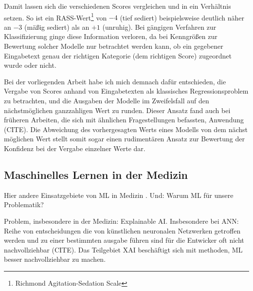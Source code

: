 Damit lassen sich die verschiedenen Scores vergleichen und in ein Verhältnis setzen. So ist ein RASS-Wert\footnote{Richmond Agitation-Sedation Scale} von $-4$ (tief sediert) beispielsweise deutlich näher an $-3$ (mäßig sediert) als an $+1$ (unruhig). Bei gängigen Verfahren zur Klassifizierung ginge diese Information verloren, da bei Kenngrößen zur Bewertung solcher Modelle nur betrachtet werden kann, ob ein gegebener Eingabetext genau der richtigen Kategorie (dem richtigen Score) zugeordnet wurde oder nicht. 

Bei der vorliegenden Arbeit habe ich mich demnach dafür entschieden, die Vergabe von Scores anhand von Eingabetexten als klassisches Regressionsproblem zu betrachten, und die Ausgaben der Modelle im Zweifelsfall auf den nächstmöglichen ganzzahligen Wert zu runden. Dieser Ansatz fand auch bei früheren Arbeiten, die sich mit ähnlichen Fragestellungen befassten, Anwendung (CITE). Die Abweichung des vorhergesagten Werts eines Modells von dem nächst möglichen Wert stellt somit sogar einen rudimentären Ansatz zur Bewertung der Konfidenz bei der Vergabe einzelner Werte dar.


\subsection{Maschinelles Lernen in der Medizin}
Hier andere Einsatzgebiete von ML in Medizin \citep{krishnanSupervisedLearningApproach2018}. Und: Warum ML für unsere Problematik?

Problem, insbesondere in der Medizin: Explainable AI. Insbesondere bei ANN: Reihe von entscheidungen die von künstlichen neuronalen Netzwerken getroffen werden und zu einer bestimmten ausgabe führen sind für die Entwicker oft nicht nachvollziehbar (CITE). Das Teilgebiet XAI beschäftigt sich mit methoden, ML besser nachvollziehbar zu machen.